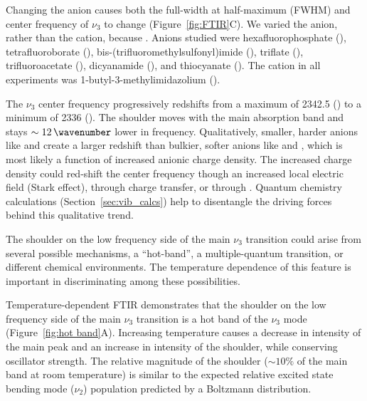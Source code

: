 \documentclass[%
  class = book,%
  crop = false,%
  float = true,%
  multi = true,%
  preview = false,%
]{standalone}
\let\cite\autocite
\begin{document}
{Changing the anion causes both the full-width at half-maximum (FWHM) and center frequency of \(\nu_3\) to change (Figure~\ref{fig:FTIR}C). We varied the anion, rather than the cation, because .\cite{anthonyJPCB-05,Cadena2004,Bhargava2007} Anions studied were hexafluorophosphate (), tetrafluoroborate (), bis-(trifluoromethylsulfonyl)imide (), triflate (), trifluoroacetate (), dicyanamide (), and thiocyanate (). The cation in all experiments was 1-butyl-3-methylimidazolium (\ce{[Im_{4,1}]}).

The \(\nu_3\) center frequency progressively redshifts from a maximum of \SI{2342.5}{\wavenumber} (\ce{[PF6]-}) to a minimum of \SI{2336}{\wavenumber} (\ce{[SCN]-}). The shoulder moves with the main absorption band and stays \(\sim\SI{12}{\wavenumber}\) lower in frequency.  Qualitatively, smaller, harder anions like \ce{[SCN]-} and \ce{[DCA]-} create a larger redshift than bulkier, softer anions like \ce{[Tf2N]-} and \ce{[TfO]-}, which is most likely a function of increased anionic charge density. The increased charge density could red-shift the  center frequency though an increased local electric field (Stark effect), through charge transfer, or through  . Quantum chemistry calculations (Section~\ref{sec:vib_calcs}) help to disentangle the driving forces behind this qualitative trend.

The shoulder on the low frequency side of the main \(\nu_3\) transition could arise from several possible mechanisms, a ``hot-band'', a multiple-quantum transition, or different chemical environments. The temperature dependence of this feature is important in discriminating among these possibilities.

Temperature-dependent FTIR demonstrates that the shoulder on the low frequency side of the main \(\nu_3\) transition  is a hot band of the \(\nu_3\) mode (Figure~\ref{fig:hot band}A). Increasing temperature causes a decrease in intensity of the main peak and an increase in intensity of the shoulder, while conserving oscillator strength. The relative magnitude of the shoulder (\(\sim 10\%\) of the main band at room temperature) is similar to the expected relative excited state bending mode (\(\nu_2\)) population predicted by a Boltzmann distribution.

}
\end{document}
